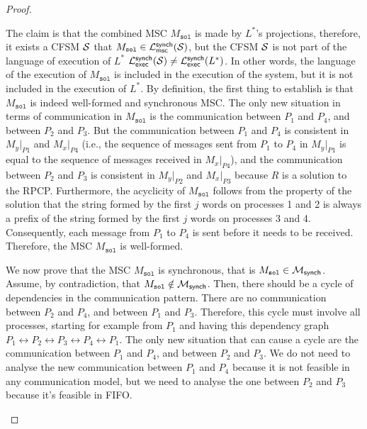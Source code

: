 \begin{proof}
\begin{itemize}
			The claim is that the combined MSC $M_{\texttt{sol}}$ is 
			made by $L^*$'s projections, therefore, it exists a CFSM $\mathcal{S}$
			that $M_{\texttt{sol}} \in \mathcal{L}_{\mathsf{msc}}^{\mathsf{synch}}(\mathcal{S})$,
			but the CFSM $\mathcal{S}$ is not part of the language of execution of $L^*$ 
			$\mathcal{L}_{\mathsf{exec}}^{\mathsf{synch}}(\mathcal{S}) \neq \mathcal{L}_{\mathsf{exec}}^{\mathsf{synch}}(L^*)$. 
			In other words, the language of the execution of $M_{\texttt{sol}}$ is included
			in the execution of the system, but it is not included in the execution of $L^*$. 
			By definition, the first thing to establish is that $M_{\texttt{sol}}$
			is indeed well-formed and synchronous MSC.
			The only new situation in terms of communication in $M_{\texttt{sol}}$ is the
			communication between $P_1$ and $P_4$, and between $P_2$ and $P_3$.
			But the communication between $P_1$ and $P_4$ is consistent in
			$M_y|_{P1}$ and $M_x|_{P4}$ (i.e., the sequence of messages sent from $P_1$ to
			$P_4$ in $M_y|_{P1}$ is equal to the sequence of messages received in $M_x|_{P4}$),
			and the communication between $P_2$ and $P_3$ is consistent in
			$M_y|_{P2}$ and $M_x|_{P3}$ because $R$ is a solution to the RPCP.
			Furthermore, the acyclicity of $M_{\texttt{sol}}$ follows from the property of the
			solution that the string formed by the first $j$ words on processes 1
			and 2 is always a prefix of the string formed by the first $j$ words
			on processes 3 and 4. Consequently, each message from $P_1$ to $P_4$
			is sent before it needs to be received. 
			Therefore, the MSC $M_{\texttt{sol}}$ is well-formed.

			We now prove that the MSC $M_{\texttt{sol}}$ is synchronous, that is
			$M_{\texttt{sol}} \in \mathcal{M}_{\mathsf{synch}}$.
			Assume, by contradiction, that 
			$M_{\texttt{sol}} \notin \mathcal{M}_{\mathsf{synch}}$.
			Then, there should be a cycle of dependencies in the communication pattern.
			There are no communication between $P_2$ and $P_4$, and between $P_1$
			and $P_3$. Therefore, this cycle must involve all processes, starting
			for example from $P_1$ and having this dependency graph
			$P_1\leftrightarrow P_2\leftrightarrow P_3\leftrightarrow P_4\leftrightarrow P_1$.
			The only new situation that can cause a cycle are the communication
			between $P_1$ and $P_4$, and between $P_2$ and $P_3$.
			We do not need to analyse the new communication between $P_1$ and $P_4$ because
			it is not feasible in any communication model, but we need to analyse the one
			between $P_2$ and $P_3$ because it's feasible in FIFO.



\end{itemize}
\end{proof}
